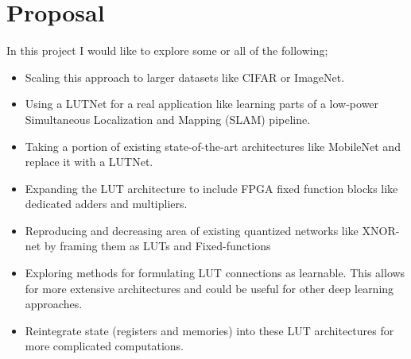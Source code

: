 \documentclass{article}
\begin{document}
\section{Proposal}
In this project I would like to explore some or all of the following;
\begin{itemize}
\item Scaling this approach to larger datasets like CIFAR or ImageNet.
\item Using a LUTNet for a real application like learning parts of a low-power Simultaneous Localization and Mapping (SLAM) pipeline.
\item Taking a portion of existing state-of-the-art architectures like MobileNet and replace it with a LUTNet.
\item Expanding the LUT architecture to include FPGA fixed function blocks like dedicated adders and multipliers. 
\item Reproducing and decreasing area of existing quantized networks like XNOR-net by framing them as LUTs and Fixed-functions
\item Exploring methods for formulating LUT connections as learnable. This allows for more extensive architectures and could be useful for other deep learning approaches. 
\item Reintegrate state (registers and memories) into these LUT architectures for more complicated computations. 
\end{itemize}






%
%
%




%
%
%
\end{document}

